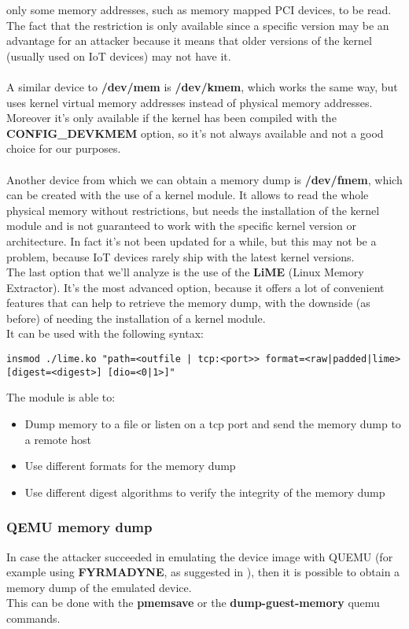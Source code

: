 only some memory addresses, such as memory mapped PCI devices, to be read.
The fact that the restriction is only available since a specific version may be an advantage for an attacker
because it means that older versions of the kernel (usually used on IoT devices) may not have it.\\\\
A similar device to \textbf{/dev/mem} is \textbf{/dev/kmem}, which works the same 
way, but uses kernel virtual memory addresses instead of physical memory addresses.\\
Moreover it's only available if the kernel has been compiled with the \textbf{CONFIG\_DEVKMEM} option, so 
it's not always available and not a good choice for our purposes.\\\\
Another device from which we can obtain a memory dump is \textbf{/dev/fmem}\cite{dev-fmem}, which
can be created with the use of a kernel module. It allows to read the whole physical memory
without restrictions, but needs the installation of the kernel module and is not guaranteed to 
work with the specific kernel version or architecture. In fact it's not been updated
for a while, but this may not be a problem, because IoT devices rarely ship with the latest
kernel versions.\\
The last option that we'll analyze is the use of the \textbf{LiME} (Linux Memory Extractor)\cite{lime}.
It's the most advanced option, because it offers a lot of convenient
features that can help to retrieve the memory dump, with the downside (as before)
of needing the installation of a kernel module.\\
It can be used with the following syntax:
\begin{lstlisting}[numbers=none]
    insmod ./lime.ko "path=<outfile | tcp:<port>> format=<raw|padded|lime> [digest=<digest>] [dio=<0|1>]"
\end{lstlisting}
The module is able to:
\begin{itemize}
    \item Dump memory to a file or listen on a tcp port and send the memory dump to a remote host
    \item Use different formats for the memory dump
    \item Use different digest algorithms to verify the integrity of the memory dump 
\end{itemize}
\subsubsection{QEMU memory dump}
In case the attacker succeeded in emulating the device image with QUEMU (for example
using \textbf{FYRMADYNE}\cite{firmadyne}, as suggested in \cite{previouswork}), then it is possible
to obtain a memory dump of the emulated device.\\
This can be done with the \textbf{pmemsave} or the \textbf{dump-guest-memory} quemu commands.\\

